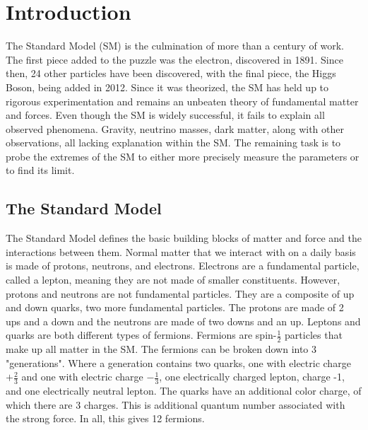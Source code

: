 \chapter{Introduction}
The Standard Model (SM) is the culmination of more than a century of work. The first piece added to the puzzle was the electron, discovered in 1891. Since then, 24 other particles have been discovered, with the final piece, the Higgs Boson, being added in 2012. Since it was theorized, the SM has held up to rigorous experimentation and remains an unbeaten theory of fundamental matter and forces. Even though the SM is widely successful, it fails to explain all observed phenomena. Gravity, neutrino masses, dark matter, along with other observations, all lacking explanation within the SM. The remaining task is to probe the extremes of the SM to either more precisely measure the parameters or to find its limit.
\section{The Standard Model}
The Standard Model defines the basic building blocks of matter and force and the interactions between them. Normal matter that we interact with on a daily basis is made of protons, neutrons, and electrons. Electrons are a fundamental particle, called a lepton, meaning they are not made of smaller constituents. However, protons and neutrons are not fundamental particles. They are a composite of up and down quarks, two more fundamental particles. The protons are made of 2 ups and a down and the neutrons are made of two downs and an up. Leptons and quarks are both different types of fermions. \linebreak
\indent Fermions are spin-${\frac{1}{2}}$ particles that make up all matter in the SM. The fermions can be broken down into 3 "generations". Where a generation contains two quarks, one with electric charge ${+\frac{2}{3}}$ and one with electric charge ${-\frac{1}{3}}$, one electrically charged lepton, charge -1, and one electrically neutral lepton. The quarks have an additional color charge, of which there are 3 charges. This is additional quantum number associated with the strong force. In all, this gives 12 fermions. \linebreak 

